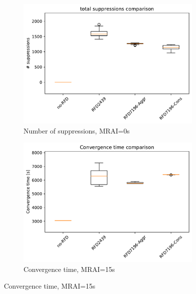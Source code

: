 \begin{figure}[H]
     \hfill
     \begin{subfigure}[b]{0.325\textwidth}
         \centering
         \includegraphics[width=\textwidth]{images/RFD/miceVSelephants/MultiMRAI/0/mice/cisco_1000MRAI0_rfd_comparison_suppressions_boxplot.pdf}
         \caption{\scriptsize Number of suppressions, MRAI=0s}
         \label{fig:1000_RFD_MRAI0_suppressions_mice}
     \end{subfigure}
     \vfill
     \begin{subfigure}[b]{0.325\textwidth}
         \centering
         \includegraphics[width=\textwidth]{images/RFD/miceVSelephants/MultiMRAI/15/mice/cisco_1000MRAI15_rfd_comparison_time_boxplot.pdf}
         \caption{\scriptsize Convergence time, MRAI=15s}
         \label{fig:1000_RFD_MRAI15_time_mice}
     \end{subfigure}

\end{figure}
